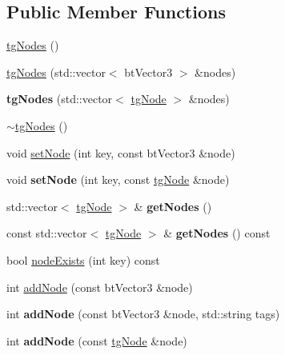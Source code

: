 \subsection*{Public Member Functions}
\begin{DoxyCompactItemize}
\item 
\hyperlink{classtg_nodes_a6983cb5b5e3c425ad85e5a1b36f2a4c9}{tg\-Nodes} ()
\item 
\hyperlink{classtg_nodes_a8a53c2c768b4b6edd4eaf8f066aef154}{tg\-Nodes} (std\-::vector$<$ bt\-Vector3 $>$ \&nodes)
\item 
\hypertarget{classtg_nodes_a299c48238fd895cf033129ba38df7185}{{\bfseries tg\-Nodes} (std\-::vector$<$ \hyperlink{classtg_node}{tg\-Node} $>$ \&nodes)}\label{classtg_nodes_a299c48238fd895cf033129ba38df7185}

\item 
\hyperlink{classtg_nodes_a88227557a774e2e532b60f83de99cd59}{$\sim$tg\-Nodes} ()
\item 
void \hyperlink{classtg_nodes_aa830c2bcf4c0e279ffb9ea15065d1693}{set\-Node} (int key, const bt\-Vector3 \&node)
\item 
\hypertarget{classtg_nodes_abb22775d220adf9395d51f90f3ab4cdc}{void {\bfseries set\-Node} (int key, const \hyperlink{classtg_node}{tg\-Node} \&node)}\label{classtg_nodes_abb22775d220adf9395d51f90f3ab4cdc}

\item 
\hypertarget{classtg_nodes_add6c0b9403616bd63b1d25038f9f90c5}{std\-::vector$<$ \hyperlink{classtg_node}{tg\-Node} $>$ \& {\bfseries get\-Nodes} ()}\label{classtg_nodes_add6c0b9403616bd63b1d25038f9f90c5}

\item 
\hypertarget{classtg_nodes_af144bb487367bbfe0e6dbaca5a9bdcf4}{const std\-::vector$<$ \hyperlink{classtg_node}{tg\-Node} $>$ \& {\bfseries get\-Nodes} () const }\label{classtg_nodes_af144bb487367bbfe0e6dbaca5a9bdcf4}

\item 
bool \hyperlink{classtg_nodes_ab16797a71bfc5366da2c7e15838038c6}{node\-Exists} (int key) const 
\item 
int \hyperlink{classtg_nodes_aa63a138ca633becefe3bc6f64bc93520}{add\-Node} (const bt\-Vector3 \&node)
\item 
\hypertarget{classtg_nodes_a4c5c3e3726efa8101afa980182fb86b3}{int {\bfseries add\-Node} (const bt\-Vector3 \&node, std\-::string tags)}\label{classtg_nodes_a4c5c3e3726efa8101afa980182fb86b3}

\item 
\hypertarget{classtg_nodes_ab4d3b3e206897c7f69cd15b95c0145c9}{int {\bfseries add\-Node} (const \hyperlink{classtg_node}{tg\-Node} \&node)}\label{classtg_nodes_ab4d3b3e206897c7f69cd15b95c0145c9}


\end{DoxyCompactItemize}
